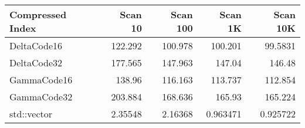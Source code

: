 \begin{tabular}{lrrrr}
\hline
 Compressed Index   &   Scan 10 &   Scan 100 &    Scan 1K &   Scan 10K \\
\hline
 DeltaCode16        & 122.292   &  100.978   & 100.201    &  99.5831   \\
 DeltaCode32        & 177.565   &  147.963   & 147.04     & 146.48     \\
 GammaCode16        & 138.96    &  116.163   & 113.737    & 112.854    \\
 GammaCode32        & 203.884   &  168.636   & 165.93     & 165.224    \\
 std::vector        &   2.35548 &    2.16368 &   0.963471 &   0.925722 \\
\hline
\end{tabular}